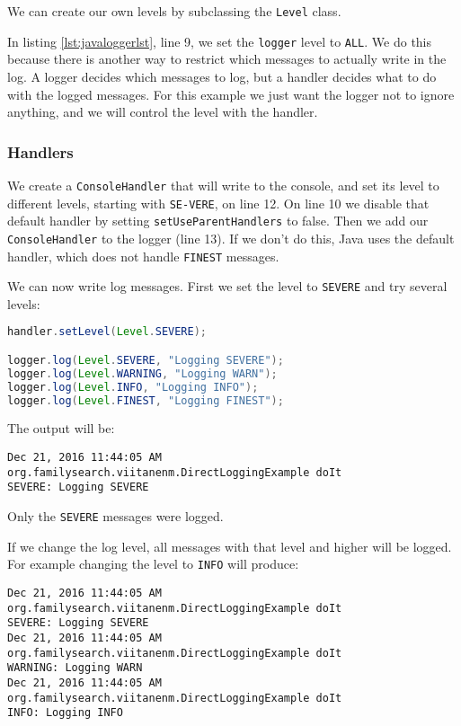 We can create our own levels by subclassing the \texttt{Level} class\cite{level}.

In listing \ref{lst:javaloggerlst}, line 9, we set the \texttt{logger} level to \texttt{ALL}. We do this because there is another way to restrict which messages to actually write in the log. A logger decides which messages to log, but a handler decides what to do with the logged messages. For this example we just want the logger not to ignore anything, and we will control the level with the handler.

\subsubsection{Handlers}
We create a \texttt{ConsoleHandler} that will write to the console, and set its level to different levels, starting with \texttt{SE\hyp{}VERE}, on line 12. On line 10 we disable that default handler by setting \texttt{setUseParentHandlers} to false. Then we add our \texttt{ConsoleHandler} to the logger (line 13). If we don't do this, Java uses the default handler, which does not handle \texttt{FINEST} messages.

We can now write log messages. First we set the level to \texttt{SEVERE} and try several levels:

\begin{lstlisting}[language=Java]
handler.setLevel(Level.SEVERE);

logger.log(Level.SEVERE, "Logging SEVERE");
logger.log(Level.WARNING, "Logging WARN");
logger.log(Level.INFO, "Logging INFO");
logger.log(Level.FINEST, "Logging FINEST");
\end{lstlisting}

The output will be:
\begin{lstlisting}
Dec 21, 2016 11:44:05 AM org.familysearch.viitanenm.DirectLoggingExample doIt
SEVERE: Logging SEVERE
\end{lstlisting}

Only the \texttt{SEVERE}  messages were logged.

If we change the log level, all messages with that level and higher will be logged. For example changing the level to \texttt{INFO} will produce:

\begin{lstlisting}
Dec 21, 2016 11:44:05 AM org.familysearch.viitanenm.DirectLoggingExample doIt
SEVERE: Logging SEVERE
Dec 21, 2016 11:44:05 AM org.familysearch.viitanenm.DirectLoggingExample doIt
WARNING: Logging WARN
Dec 21, 2016 11:44:05 AM org.familysearch.viitanenm.DirectLoggingExample doIt
INFO: Logging INFO
\end{lstlisting}

